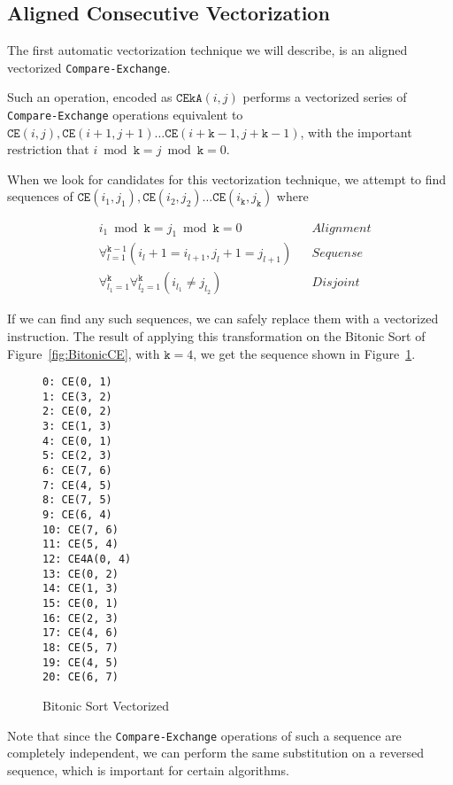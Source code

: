 \subsection{Aligned Consecutive Vectorization}


The first automatic vectorization technique we will describe, is an aligned vectorized \texttt{Compare-Exchange}.

Such an operation, encoded as $\mathtt{CEkA}(i,j)$ performs a vectorized series of \texttt{Compare-Exchange} operations equivalent to $\mathtt{CE}(i,j), \mathtt{CE}(i+1, j+1) \dots \mathtt{CE}(i+\mathtt{k}-1, j+\mathtt{k}-1)$, with the important restriction that $i \bmod \mathtt{k} = j \bmod \mathtt{k} = 0$.

When we look for candidates for this vectorization technique, we attempt to find sequences of $\mathtt{CE}(i_1, j_1), \mathtt{CE}(i_2, j_2) \dots \mathtt{CE}(i_\mathtt{k}, j_\mathtt{k})$ where  

\[
\begin{aligned}
&i_1 \bmod \mathtt{k} = j_1 \bmod \mathtt{k} = 0 && Alignment\\ 
&\forall_{l=1}^{\mathtt{k}-1} (i_l+1=i_{l+1}, j_l+1=j_{l+1}) && Sequense \\
&\forall_{l_1=1}^{\mathtt{k}} \forall_{l_2=1}^{\mathtt{k}} (i_{l_1} \neq j_{l_2})  && Disjoint
\end{aligned}
\]

If we can find any such sequences, we can safely replace them with a vectorized instruction. The result of applying this transformation on the Bitonic Sort of Figure~\ref{fig:BitonicCE}, with $\mathtt{k} = 4$, we get the sequence shown in Figure~\ref{fig:BitonicCEA}.
\begin{figure}
\begin{multicols}{3}
\begin{verbatim}
0: CE(0, 1)
1: CE(3, 2)
2: CE(0, 2)
3: CE(1, 3)
4: CE(0, 1)
5: CE(2, 3)
6: CE(7, 6)
7: CE(4, 5)
8: CE(7, 5)
9: CE(6, 4)
10: CE(7, 6)
11: CE(5, 4)
12: CE4A(0, 4)
13: CE(0, 2)
14: CE(1, 3)
15: CE(0, 1)
16: CE(2, 3)
17: CE(4, 6)
18: CE(5, 7)
19: CE(4, 5)
20: CE(6, 7)
\end{verbatim}
\end{multicols}
\caption{Bitonic Sort Vectorized}
\label{fig:BitonicCEA}
\end{figure}

Note that since the \texttt{Compare-Exchange} operations of such a sequence are completely independent, we can perform the same substitution on a reversed sequence, which is important for certain algorithms.

